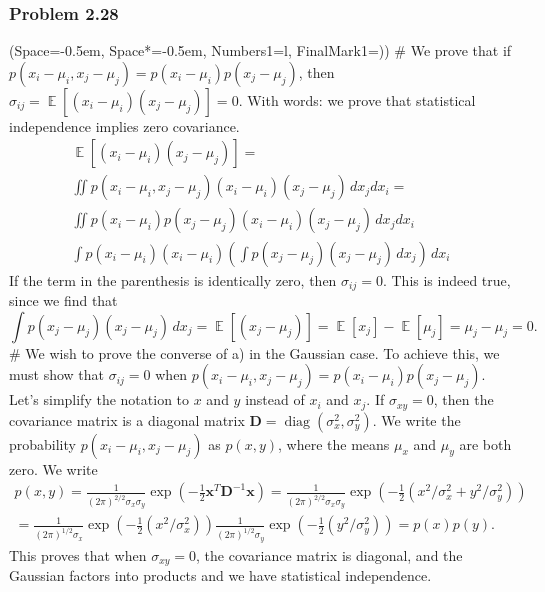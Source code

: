 \documentclass[12pt, a4paper]{article}
\newcommand{\listSpace}{-0.5em}%
\newcommand{\vect}[1]{\bm{#1}}
\DeclareMathOperator{\E}{\mathbb{E}}
\begin{document}
\subsubsection*{Problem 2.28}
\begin{easylist}[enumerate]
\ListProperties(Space=\listSpace, Space*=\listSpace, Numbers1=l, FinalMark1={)})
# We prove that if $p(x_i - \mu_i, x_j - \mu_j) = p(x_i - \mu_i) p(x_j - \mu_j)$, then $\sigma_{ij} = \E \left[ (x_i - \mu_i) (x_j - \mu_j)\right] = 0.$
With words: we prove that statistical independence implies zero covariance.
\begin{gather*}
	 \E \left[ (x_i - \mu_i) (x_j - \mu_j)\right] = \\
	 \iint p(x_i - \mu_i, x_j - \mu_j) (x_i - \mu_i) (x_j - \mu_j) \, dx_j dx_i = \\
	 \iint  p(x_i - \mu_i) p(x_j - \mu_j) (x_i - \mu_i) (x_j - \mu_j) \, dx_j dx_i \\
	 \int p(x_i - \mu_i) (x_i - \mu_i) \left( 
	 \int p(x_j - \mu_j) (x_j - \mu_j) \, dx_j
	   \right) \, dx_i
\end{gather*}
If the term in the parenthesis is identically zero, then $\sigma_{ij} = 0$.
This is indeed true, since we find that
\begin{equation*}
	\int p(x_j - \mu_j) (x_j - \mu_j) \, dx_j = \E \left[ (x_j - \mu_j)\right]
	= \E \left[x_j\right] -  \E \left[\mu_j\right] = \mu_j - \mu_j = 0.
\end{equation*}
# We wish to prove the converse of a) in the Gaussian case.
To achieve this, we must show that
$\sigma_{ij} = 0$ when $p(x_i - \mu_i, x_j - \mu_j) = p(x_i - \mu_i) p(x_j - \mu_j)$.
Let's simplify the notation to $x$ and $y$ instead of $x_i$ and $x_j$.
If $\sigma_{xy} = 0$, then the covariance matrix is a diagonal matrix $\vect{D} = \operatorname{diag}(\sigma_x^2, \sigma_y^2)$.
We write the probability $p(x_i - \mu_i, x_j - \mu_j)$ as $p(x,y)$, where the means $\mu_x$ and $\mu_y$ are both zero.
We write
\begin{gather*}
	p(x, y) = 
	\frac{1}{(2\pi)^{2/2} \sigma_x \sigma_y} \exp \left( - \frac{1}{2} \vect{x}^T \vect{D}^{-1} \vect{x} \right) = 
	\frac{1}{(2\pi)^{2/2} \sigma_x \sigma_y} \exp \left( - \frac{1}{2} \left( x^2 / \sigma_x^2 + y^2 / \sigma_y^2 \right) \right)  \\
	=  \frac{1}{(2\pi)^{1/2} \sigma_x} \exp \left( - \frac{1}{2} \left( x^2 / \sigma_x^2 \right) \right) 
	\frac{1}{(2\pi)^{1/2} \sigma_y} \exp \left( - \frac{1}{2} \left( y^2 / \sigma_y^2 \right) \right)
	= p(x) p(y).
\end{gather*}
This proves that when $\sigma_{xy} = 0$, the covariance matrix is diagonal, and the Gaussian factors into products and we have statistical independence.


\end{easylist}
\end{document}
